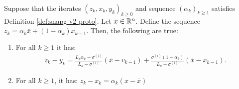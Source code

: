 \documentclass[12pt]{article}
\begin{document}
    \begin{lemma}\label{lemma:iters-snapg2-proto}
        Suppose that the iterates $(z_k, x_k, y_k)_{k \ge 0}$ and sequence $(\alpha_k)_{k \ge 1}$ satisfies Definition \ref{def:snapg-v2-proto}. 
        Let $\bar x \in \mathbb R^n$.
        Define the sequence $z_k = \alpha_k\bar x + (1 - \alpha_k)x_{k - 1}$. 
        Then, the following are true: 
        \begin{enumerate}
            \item\label{lemma:iters-snapg2-proto-item1} For all $k \ge 1$ it has: 
            \begin{align*}
                    z_k - y_k 
                    = 
                    \frac{L_k\alpha_k - \sigma^{(i)}}{L_k - \sigma^{(i)}}(\bar x - v_{k - 1})
                    + \frac{\sigma^{(i)}(1 - \alpha_k)}{L_k - \sigma^{(i)}}(\bar x - x_{k - 1}).
            \end{align*}
            \item\label{lemma:iters-snapg2-proto-item2} For all $k \ge 1$, it has: $z_k - x_k = \alpha_k(x - \bar x)$
        \end{enumerate}
    \end{lemma}
\end{document}
